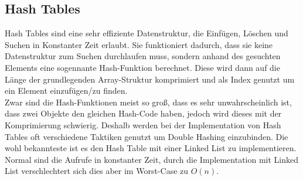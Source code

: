 \documentclass[
../../AuD-Zusammenfassung.tex,
]
{subfiles}
\begin{document}
\subsection{Hash Tables}
Hash Tables sind eine sehr effiziente Datenstruktur, die Einfügen, Löschen und Suchen in Konstanter Zeit erlaubt. Sie funktioniert dadurch, dass sie keine Datenstruktur zum Suchen durchlaufen muss, sondern anhand des gesuchten Elements eine sogennante Hash-Funktion berechnet. Diese wird dann auf die Länge der grundlegenden Array-Struktur komprimiert und als Index genutzt um ein Element einzufügen/zu finden. \\
Zwar sind die Hash-Funktionen meist so groß, dass es sehr unwahrscheinlich ist, dass zwei Objekte den gleichen Hash-Code haben, jedoch wird dieses mit der Komprimierung schwierig. Deshalb werden bei der Implementation von Hash Tables oft verschiedene Taktiken genutzt um Double Hashing einzubinden. Die wohl bekannteste ist es den Hash Table mit einer Linked List zu implementieren. \\
Normal sind die Aufrufe in konstanter Zeit, durch die Implementation mit Linked List verschlechtert sich dies aber im Worst-Case zu $O(n)$.
\end{document}
